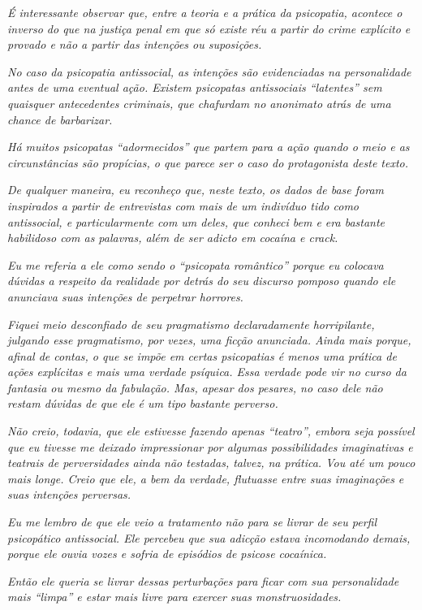 \emph{É interessante observar que, entre a teoria e a prática da
psicopatia, acontece o inverso do que na justiça penal em que só existe
réu a partir do crime explícito e provado e não a partir das intenções
ou suposições.}

\emph{No caso da psicopatia antissocial, as intenções são evidenciadas na
personalidade antes de uma eventual ação. Existem psicopatas
antissociais ``latentes'' sem quaisquer antecedentes criminais, que
chafurdam no anonimato atrás de uma chance de barbarizar.}

\emph{Há muitos psicopatas ``adormecidos'' que partem para a ação quando
o meio e as circunstâncias são propícias, o que parece ser o caso do
protagonista deste texto.}

\emph{De qualquer maneira, eu reconheço que, neste texto, os dados de
base foram inspirados a partir de entrevistas com mais de um indivíduo
tido como antissocial, e particularmente com um deles, que conheci bem e
era bastante habilidoso com as palavras, além de ser adicto em cocaína e
crack.}

\emph{Eu me referia a ele como sendo o ``psicopata romântico'' porque eu
colocava dúvidas a respeito da realidade por detrás do seu discurso
pomposo quando ele anunciava suas intenções de perpetrar horrores.}

\emph{Fiquei meio desconfiado de seu pragmatismo declaradamente
horripilante, julgando esse pragmatismo, por vezes, uma ficção
anunciada. Ainda mais porque, afinal de contas, o que se impõe em certas
psicopatias é menos uma prática de ações explícitas e mais uma verdade
psíquica. Essa verdade pode vir no curso da fantasia ou mesmo da
fabulação. Mas, apesar dos pesares, no caso dele não restam dúvidas de
que ele é um tipo bastante perverso.}

\emph{Não creio, todavia, que ele estivesse fazendo apenas ``teatro'',
embora seja possível que eu tivesse me deixado impressionar por algumas
possibilidades imaginativas e teatrais de perversidades ainda não
testadas, talvez, na prática. Vou até um pouco mais longe. Creio que
ele, a bem da verdade, flutuasse entre suas imaginações e suas intenções
perversas.}

\emph{Eu me lembro de que ele veio a tratamento não para se livrar de
seu perfil psicopático antissocial. Ele percebeu que sua adicção estava
incomodando demais, porque ele ouvia vozes e sofria de episódios de
psicose cocaínica.}

\emph{Então ele queria se livrar dessas perturbações para ficar com sua
personalidade mais ``limpa'' e estar mais livre para exercer suas
monstruosidades.}


